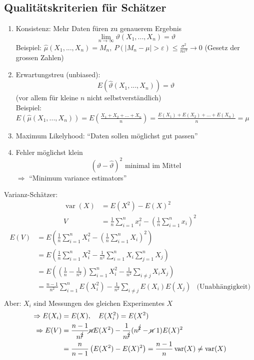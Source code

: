 \documentclass[10pt,a4paper]{scrartcl}
\DeclareMathOperator{\var}{var}
\begin{document}
\subsection{Qualitätskriterien für Schätzer}
\begin{enumerate}
\item Konsistenz: Mehr Daten füren zu genauerem Ergebnis
    $$ \lim_{n\to\infty} \vartheta(X_1, ..., X_n) = \vartheta $$
    Beispiel: $\hat{\mu} (X_1, ..., X_n) = M_n,\ P(|M_n - \mu| > \varepsilon) \le \frac{\sigma^2}{n\varepsilon^2} \to 0 $ (Gesetz der grossen Zahlen)
\item Erwartungstreu (unbiased):
    $$ E(\hat{\vartheta}(X_1, ..., X_n)) = \vartheta$$
    (vor allem für kleine $n$ nicht selbstverständlich)\\
    Beispiel: $E(\hat{\mu}(X_1, ..., X_n)) = E\left(\frac{X_1+ X_2+ \dots+ X_n}{n}\right) = \frac{E(X_1)+ E(X_2)+ \dots+ E(X_n)}{n} = \mu$
\item Maximum Likelyhood: 
    ``Daten sollen möglichst gut passen''
\item Fehler möglichst klein
    $$ (\vartheta - \hat{\vartheta})^2 \text{ minimal im Mittel}$$
    $\Rightarrow$ ``Minimum variance estimators''
\end{enumerate}

Varianz-Schätzer:
\begin{align*}
    \var(X) &= E(X^2) - E(X)^2 \\
    V &= \frac{1}{n} \sum_{i=1}^n x_i^2 - \left(\frac{1}{n} \sum_{i=1}^n x_i\right)^2
\end{align*}
\begin{align*}
    E(V) &= E\left(\frac{1}{n} \sum_{i=1}^n X_i^2 - \left(\frac{1}{n} \sum_{i=1}^n X_i\right)^2\right) \\
         &= E\left(\frac{1}{n} \sum_{i=1}^n X_i^2 - \frac{1}{n^2} \sum_{i=1}^nX_i \sum_{j=1}^n X_j\right) \\
         &= E\left(\left(\frac{1}{n}-\frac{1}{n^2}\right) \sum_{i=1}^n X_i^2 - \frac{1}{n^2} \sum_{i\neq j} X_iX_j \right) \\
         &= \frac{n-1}{n^2} \sum_{i=1}^n E(X_i^2) - \frac{1}{n^2} \sum_{i\neq j} E(X_i)E(X_j) & \text{(Unabhängigkeit)} \\
\end{align*}
Aber: $X_i$ sind Messungen des gleichen Experimentes $X$
\begin{align*}
  \Rightarrow E(X_i) &= E(X),\quad E(X_i^2) = E(X^2) \\
  \Rightarrow E(V) &= \frac{n-1}{n^{\cancel{2}}} \cancel{n} E(X^2) - \frac{1}{n^{\cancel{2}}}(n^{\cancel{2}}-\cancel{n}\ 1) E(X)^2 \\
  &= \frac{n}{n-1} \left(E(X^2) - E(X)^2\right) = \frac{n-1}{n} \var(X) \neq \var(X)
\end{align*}
\end{document}
